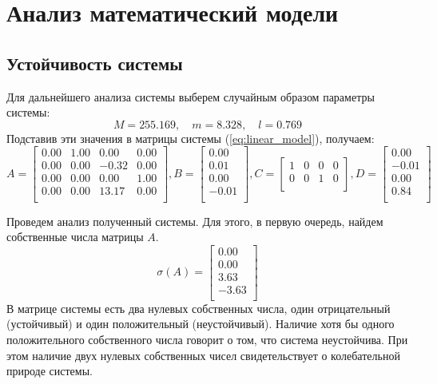 \section{Анализ математический модели}
\subsection{Устойчивость системы} 
Для дальнейшего анализа системы выберем случайным образом параметры системы:
\begin{equation}
    M = 255.169,\quad m = 8.328,\quad l = 0.769
\end{equation}
Подставив эти значения в матрицы системы (\ref{eq:linear_model}), получаем: 
\begin{equation}
    A = \begin{bmatrix}
    0.00  & 1.00  & 0.00  & 0.00 \\ 
    0.00  & 0.00  & -0.32  & 0.00 \\ 
    0.00  & 0.00  & 0.00  & 1.00 \\ 
    0.00  & 0.00  & 13.17  & 0.00 \\ 
    \end{bmatrix},
    B = \begin{bmatrix}
    0.00 \\ 
    0.01 \\ 
    0.00 \\ 
    -0.01 \\ 
    \end{bmatrix}, 
    C = \begin{bmatrix}
    1  & 0  & 0  & 0 \\ 
    0  & 0  & 1  & 0 \\ 
    \end{bmatrix},
    D = \begin{bmatrix}
    0.00 \\ 
    -0.01 \\ 
    0.00 \\ 
    0.84 \\ 
    \end{bmatrix}
\end{equation}

Проведем анализ полученный системы. Для этого, в первую очередь, найдем собственные числа матрицы $A$. 
\begin{equation}
    \sigma(A) = \begin{bmatrix}
    0.00 \\ 
    0.00 \\ 
    3.63 \\ 
    -3.63 \\ 
    \end{bmatrix}
\end{equation}
В матрице системы есть два нулевых собственных числа, один отрицательный (устойчивый) и один положительный (неустойчивый). 
Наличие хотя бы одного положительного собственного числа говорит о том, что система неустойчива. При этом 
наличие двух нулевых собственных чисел свидетельствует о колебательной природе системы. 

